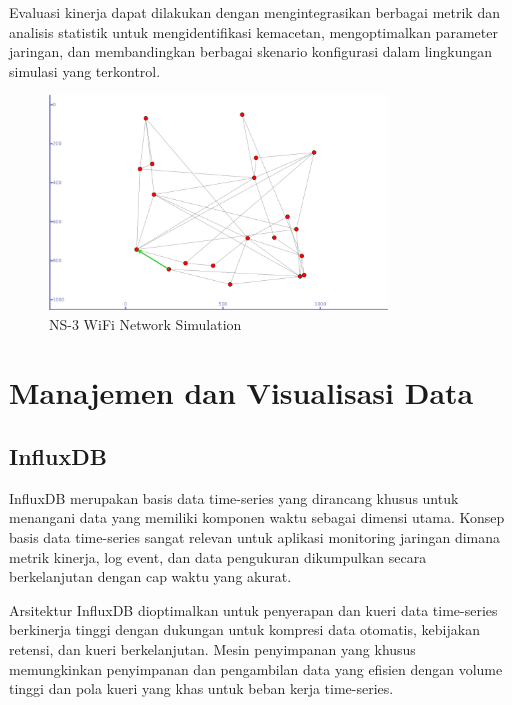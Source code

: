 Evaluasi kinerja dapat dilakukan dengan mengintegrasikan berbagai metrik dan analisis statistik untuk mengidentifikasi kemacetan, mengoptimalkan parameter jaringan, dan membandingkan berbagai skenario konfigurasi dalam lingkungan simulasi yang terkontrol.

\begin{figure}[h]
    \centering
    \includegraphics[width=0.8\textwidth]{assets/pics/bab3_18.png}
    \caption{NS-3 WiFi Network Simulation}
    \label{fig:ns3_wifi_simulation}
\end{figure}

\section{Manajemen dan Visualisasi Data}

\subsection{InfluxDB}

InfluxDB merupakan basis data time-series yang dirancang khusus untuk menangani data yang memiliki komponen waktu sebagai dimensi utama. Konsep basis data time-series sangat relevan untuk aplikasi monitoring jaringan dimana metrik kinerja, log event, dan data pengukuran dikumpulkan secara berkelanjutan dengan cap waktu yang akurat.

Arsitektur InfluxDB dioptimalkan untuk penyerapan dan kueri data time-series berkinerja tinggi dengan dukungan untuk kompresi data otomatis, kebijakan retensi, dan kueri berkelanjutan. Mesin penyimpanan yang khusus memungkinkan penyimpanan dan pengambilan data yang efisien dengan volume tinggi dan pola kueri yang khas untuk beban kerja time-series.

